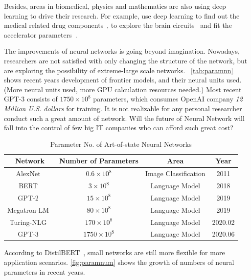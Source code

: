 \begin{spacing}{1.5}
Besides, areas in biomedical, physics and mathematics are also using deep learning to drive their research. For example, use deep learning to find out the medical related drug components~\cite{ma2015deep}, to explore the brain circuits~\cite{helmstaedter2013connectomic} and fit the accelerator parameters~\cite{ciodaro2012online}.

The improvements of neural networks is going beyond imagination. Nowadays, researchers are not satisfied with only changing the structure of the network, but are exploring the possibility of extreme-large scale networks. ~\autoref{tab:paramnn} shows recent years development of frontier models, and their neural units used. (More neural units used, more GPU calculation resources needed.) Most recent GPT-3 consists of $1750 \times {10}^8$ parameters, which consumes OpenAI company \textit{12 Million U.S. dollars} for training. It is not realizable for any personal researcher conduct such a great amount of network. Will the future of Neural Network will fall into the 
control of few big IT companies who can afford such great cost?

\begin{table}[ht]
\caption{Parameter No. of Art-of-state Neural Networks}
\label{tab:paramnn}
\begin{tabular}{cccc}
\hline
\textbf{Network} & \textbf{Number of Parameters} & \textbf{Area}        & \textbf{Year} \\ \hline
AlexNet~\cite{krizhevsky2012imagenet}     & $0.6 \times {10}^{8}$ & Image Classification & 2011     \\
BERT~\cite{Jacob2018BERT}        & $3 \times {10}^{8}$   & Language Model       & 2018     \\
GPT-2~\cite{radford2019language}       & $15 \times {10}^{8}$  & Language Model       & 2019     \\
Megatron-LM~\cite{Shoebi2019MegatronLM} & $80 \times {10}^{8}$  & Language Model       & 2019     \\
Turing-NLG~\cite{tnlg}  & $170 \times {10}^{8}$ & Language Model       & 2020.02 \\
GPT-3~\cite{brown2020language}       & $1750 \times {10}^{8}$  & Language Model       & 2020.06 \\ \hline
\end{tabular}
\end{table}

According to DistilBERT~\cite{sanh2019distilbert}, small networks are still more flexible for more application scenarios. \autoref{fig:paramnum} shows the growth of numbers of neural parameters in recent years.


\end{spacing}
